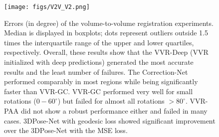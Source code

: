 \documentclass[journal,transmag]{IEEEtran}
\begin{document}

\begin{figure}
    \centering
    \texttt{[image: figs/V2V\_V2.png]}
    \caption{Errors (in degree) of the volume-to-volume registration experiments. Median is displayed in boxplots; dots represent outliers outside 1.5 times the interquartile range of the upper and lower quartiles, respectively. Overall, these results show that the VVR-Deep (VVR initialized with deep predictions) generated the most accurate results and the least number of failures. The Correction-Net performed comparably in most regions while being significantly faster than VVR-GC. VVR-GC performed very well for small rotations ($0-60^\circ$) but failed for almost all rotations $>80^\circ$. VVR-PAA did not show a robust performance either and failed in many cases. 3DPose-Net with geodesic loss showed significant improvement over the 3DPose-Net with the MSE loss.}
    \label{fig:V2V}
\end{figure}
\end{document}
